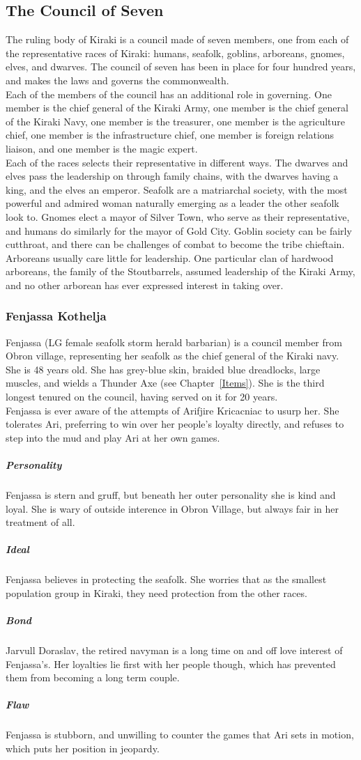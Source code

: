 \subsection{The Council of Seven}
The ruling body of Kiraki is a council made of seven members, one from each of the representative races of Kiraki: humans, seafolk, goblins, arboreans, gnomes, elves, and dwarves. The council of seven has been in place for four hundred years, and makes the laws and governs the commonwealth.\\
Each of the members of the council has an additional role in governing. One member is the chief general of the Kiraki Army, one member is the chief general of the Kiraki Navy, one member is the treasurer, one member is the agriculture chief, one member is the infrastructure chief, one member is foreign relations liaison, and one member is the magic expert.\\
Each of the races selects their representative in different ways. The dwarves and elves pass the leadership on through family chains, with the dwarves having a king, and the elves an emperor. Seafolk are a matriarchal society, with the most powerful and admired woman naturally emerging as a leader the other seafolk look to. Gnomes elect a mayor of Silver Town, who serve as their representative, and humans do similarly for the mayor of Gold City. Goblin society can be fairly cutthroat, and there can be challenges of combat to become the tribe chieftain. Arboreans usually care little for leadership. One particular clan of hardwood arboreans, the family of the Stoutbarrels, assumed leadership of the Kiraki Army, and no other arborean has ever expressed interest in taking over.
\subsubsection{Fenjassa Kothelja}
Fenjassa (LG female seafolk storm herald barbarian) is a council member from Obron village, representing her seafolk as the chief general of the Kiraki navy. She is 48 years old. She has grey-blue skin, braided blue dreadlocks, large muscles, and wields a Thunder Axe (see Chapter~\ref{Items}). She is the third longest tenured on the council, having served on it for 20 years.\\
Fenjassa is ever aware of the attempts of Arifjire Kricacniac to usurp her. She tolerates Ari, preferring to win over her people's loyalty directly, and refuses to step into the mud and play Ari at her own games.
\subparagraph{Personality} Fenjassa is stern and gruff, but beneath her outer personality she is kind and loyal. She is wary of outside interence in Obron Village, but always fair in her treatment of all.
\subparagraph{Ideal} Fenjassa believes in protecting the seafolk. She worries that as the smallest population group in Kiraki, they need protection from the other races.
\subparagraph{Bond} Jarvull Doraslav, the retired navyman is a long time on and off love interest of Fenjassa's. Her loyalties lie first with her people though, which has prevented them from becoming a long term couple.
\subparagraph{Flaw} Fenjassa is stubborn, and unwilling to counter the games that Ari sets in motion, which puts her position in jeopardy.

